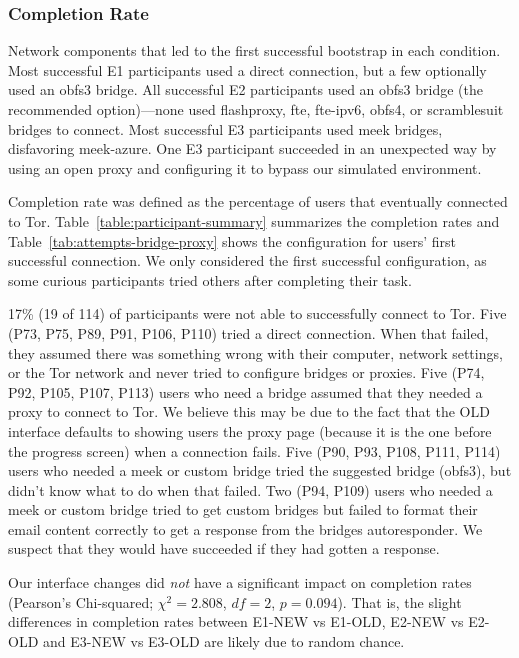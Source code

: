 \documentclass[USenglish,oneside,twocolumn]{article}
\begin{document}
\subsubsection{Completion Rate} 

\begin{table}[t]
\centering

\caption{
Network components that led to the first successful bootstrap
in each condition.
Most successful E1 participants used a direct connection,
but a few optionally used an obfs3 bridge.
All successful E2 participants used 
an obfs3 bridge (the recommended option)---none used 
flashproxy, fte, fte-ipv6, obfs4, or scramblesuit bridges to connect. 
Most successful E3 participants
used meek bridges, disfavoring meek-azure.
One E3 participant succeeded in an unexpected way
by using an open proxy and configuring it to bypass our 
simulated environment.
}
\label{tab:attempts-bridge-proxy}
\end{table}

Completion rate was defined as the percentage of users that eventually connected to Tor. Table~\ref{table:participant-summary} summarizes the completion rates and Table~\ref{tab:attempts-bridge-proxy} shows the configuration for users' first successful connection. We only considered the first successful configuration, as some curious participants tried others after completing their task. 

17\% (19 of 114) of participants were not able to successfully connect to Tor. Five (P73, P75, P89, P91, P106, P110) tried a direct connection. When that failed, they assumed there was something wrong with their computer, network settings, or the Tor network and never tried to configure bridges or proxies. Five (P74, P92, P105, P107, P113) users who need a bridge assumed that they needed a proxy to connect to Tor. We believe this may be due to the fact that the OLD interface defaults to showing users the proxy page (because it is the one before the progress screen) when a connection fails. Five (P90, P93, P108, P111, P114) users who needed a meek or custom bridge tried the suggested bridge (obfs3), but didn't know what to do when that failed. Two (P94, P109) users who needed a meek or custom bridge tried to get custom bridges but failed to format their email content correctly to get a response from the bridges autoresponder. We suspect that they would have succeeded if they had gotten a response.

Our interface changes did {\it not} have a significant impact on completion rates (Pearson's Chi-squared; $\chi^2 = 2.808$, $df = 2$, $p = 0.094$). That is, the slight differences in completion rates between E1-NEW vs E1-OLD, E2-NEW vs E2-OLD and E3-NEW vs E3-OLD are likely due to random chance.
\end{document}
